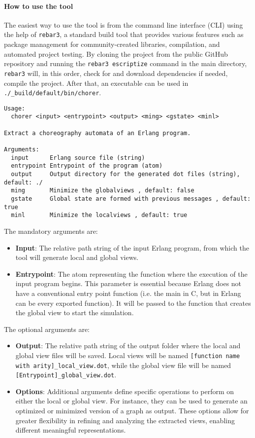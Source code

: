 \paragraph{How to use the tool}
The easiest way to use the tool is from the command line interface (CLI)
using the help of \texttt{rebar3}, a standard build tool that provides various features
such as package management for community-created libraries, compilation, and
automated project testing. By cloning the project from the public GitHub
repository and running the \texttt{rebar3 escriptize} command in the main
directory, \texttt{rebar3} will, in this order, check for and download
dependencies if needed, compile the project. After
that, an executable can be used in \texttt{./\_build/default/bin/chorer}.

\begin{lstlisting}[caption=Usage message]
Usage:
  chorer <input> <entrypoint> <output> <ming> <gstate> <minl>

Extract a choreography automata of an Erlang program.

Arguments:
  input      Erlang source file (string)
  entrypoint Entrypoint of the program (atom)
  output     Output directory for the generated dot files (string), default: ./
  ming       Minimize the globalviews , default: false
  gstate     Global state are formed with previous messages , default: true
  minl       Minimize the localviews , default: true
\end{lstlisting}

\noindent The mandatory arguments are:
\begin{itemize}
    \item \textbf{Input}: The relative path string of the input Erlang program,
    from which the tool will generate local and global views.
    \item \textbf{Entrypoint}: The atom representing the function where the
    execution of the input program begins. This parameter is essential because
    Erlang does not have a conventional entry point function (i.e. the main in C,
    but in Erlang can be every exported function). It will be passed to the
    function that creates the global view to start the simulation.
\end{itemize}

\noindent The optional arguments are:
\begin{itemize}
    \item \textbf{Output}: The relative path string of the output folder where
    the local and global view files will be saved. Local views will be named
    \texttt{[function name with arity]\_local\_view.dot}, while the global view
    file will be named \texttt{[Entrypoint]\_global\_view.dot}.
    \item \textbf{Options}: Additional arguments define specific operations  
    to perform on either the local or global view. For instance, they  
    can be used to generate an optimized or minimized version of a  
    graph as output. These options allow for greater flexibility in  
    refining and analyzing the extracted views, enabling different 
    meaningful representations.
\end{itemize}

